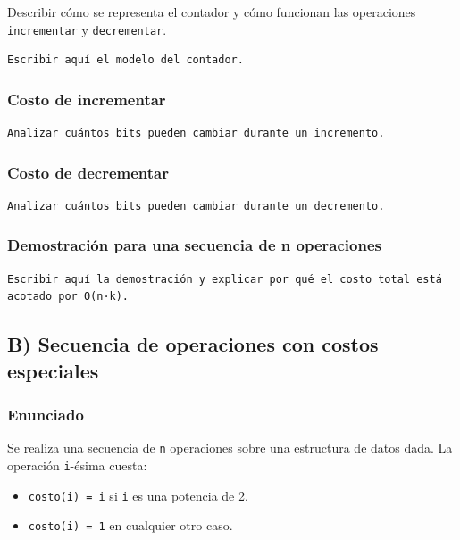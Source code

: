 \documentclass[11pt]{article}
\begin{document}
Describir cómo se representa el contador y cómo funcionan las operaciones \texttt{incrementar} y \texttt{decrementar}.

\begin{verbatim}
Escribir aquí el modelo del contador.
\end{verbatim}

\subsubsection{Costo de incrementar}
\label{sec:org0f76416}

\begin{verbatim}
Analizar cuántos bits pueden cambiar durante un incremento.
\end{verbatim}

\subsubsection{Costo de decrementar}
\label{sec:org6d75c5d}

\begin{verbatim}
Analizar cuántos bits pueden cambiar durante un decremento.
\end{verbatim}

\subsubsection{Demostración para una secuencia de n operaciones}
\label{sec:orgdc2b95d}

\begin{verbatim}
Escribir aquí la demostración y explicar por qué el costo total está acotado por Θ(n·k).
\end{verbatim}

\subsection{B) Secuencia de operaciones con costos especiales}
\label{sec:org300614e}

\subsubsection{Enunciado}
\label{sec:orgf0b4909}

Se realiza una secuencia de \texttt{n} operaciones sobre una estructura de datos dada. La operación \texttt{i}-ésima cuesta:

\begin{itemize}
\item \texttt{costo(i) = i} si \texttt{i} es una potencia de 2.
\item \texttt{costo(i) = 1} en cualquier otro caso.
\end{itemize}
\end{document}
